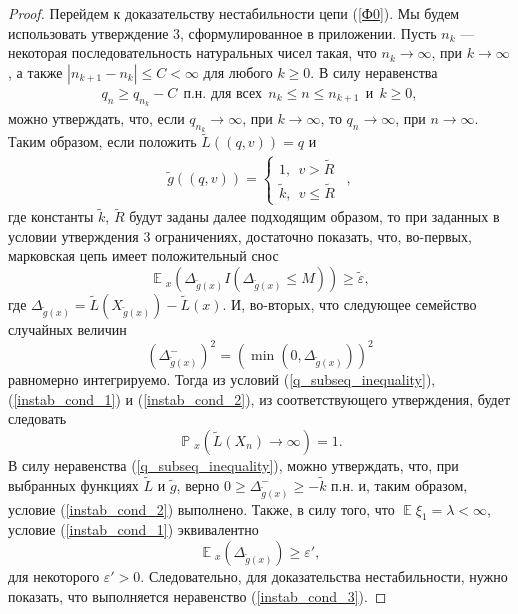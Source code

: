 \documentclass[10pt, reqno]{amsart}
\DeclareMathOperator*{\E}{\mathbb{E}}
\DeclareMathOperator*{\Pb}{\mathbb{P}}
\begin{document}
\begin{proof}
Перейдем к доказательству нестабильности цепи (\ref{Ф0}). Мы будем использовать утверждение 3, сформулированное в приложении. Пусть $n_{k}$ --- некоторая последовательность натуральных чисел такая, что $n_{k} \xrightarrow{} \infty$, при $k \xrightarrow{} \infty$, а также $|n_{k+1}-n_{k}| \leq C < \infty$ для любого $k \geq 0$. В силу неравенства
\begin{align}
    q_{n} \geq q_{n_{k}} - C \:\: \text{п.н. для всех} \:\: n_{k} \leq n  \leq n_{k+1} \:\:\text{и}\:\: k \geq 0,
    \label{q_subseq_inequality}
\end{align}
можно утверждать, что, если $q_{n_{k}} \xrightarrow{} \infty$, при $k \xrightarrow{} \infty$, то $q_{n} \xrightarrow{} \infty$, при $n \xrightarrow{} \infty$. Таким образом, если положить $\widetilde{L}((q, v)) = q$ и
\begin{align*}
    \widetilde{g}((q, v)) = \begin{cases}
    1,\:\: v > \widetilde{R}\:\:\\
    \widetilde{k},\:\: v \leq \widetilde{R}\:\:
    \end{cases},
\end{align*}
где константы $\widetilde{k}$, $\widetilde{R}$ будут заданы далее подходящим образом, то при заданных в условии утверждения 3 ограничениях, достаточно показать, что, во-первых, марковская цепь имеет положительный снос
\begin{equation}
    \E{}_{x}(\Delta_{\widetilde{g}(x)}I(\Delta_{\widetilde{g}(x)} \leq M)) \geq \widetilde{\varepsilon},
    \label{instab_cond_1}
\end{equation}
где $\Delta_{\widetilde{g}(x)} = \widetilde{L}(X_{\widetilde{g}(x)}) - \widetilde{L}(x)$. И, во-вторых, что следующее семейство случайных величин
\begin{equation}
    (\Delta^{-}_{\widetilde{g}(x)})^{2} = (\min(0, \Delta_{\widetilde{g}(x)}))^{2}
    \label{instab_cond_2}
\end{equation}
равномерно интегрируемо. Тогда из условий (\ref{q_subseq_inequality}), (\ref{instab_cond_1}) и (\ref{instab_cond_2}), из соответствующего утверждения, будет следовать
\begin{equation*}
    \Pb{}_{x}(\widetilde{L}(X_{n}) \xrightarrow{} \infty) = 1.
\end{equation*}
В силу неравенства (\ref{q_subseq_inequality}), можно утверждать, что, при выбранных функциях $\widetilde{L}$ и $\widetilde{g}$, верно $0 \geq \Delta^{-}_{\widetilde{g}(x)} \geq -\widetilde{k}$ п.н. и, таким образом, условие (\ref{instab_cond_2}) выполнено. Также, в силу того, что $\E\xi_{1} = \lambda < \infty$, условие (\ref{instab_cond_1}) эквивалентно
\begin{equation}
    \E{}_{x}(\Delta_{\widetilde{g}(x)}) \geq \varepsilon',
    \label{instab_cond_3}
\end{equation}
для некоторого $\varepsilon' > 0$. Следовательно, для доказательства нестабильности, нужно показать, что выполняется неравенство (\ref{instab_cond_3}).


\end{proof}
\end{document}
